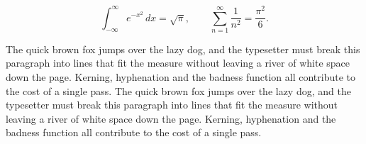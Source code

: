 \documentclass{article}
\begin{document}
\begin{equation}
\int_{-\infty}^{\infty} e^{-x^{2}}\,dx = \sqrt{\pi}, \qquad
\sum_{n=1}^{\infty} \frac{1}{n^{2}} = \frac{\pi^{2}}{6}.
\end{equation}

The quick brown fox jumps over the lazy dog, and the typesetter must break this paragraph into lines that fit the measure without leaving a river of white space down the page. Kerning, hyphenation and the badness function all contribute to the cost of a single pass. The quick brown fox jumps over the lazy dog, and the typesetter must break this paragraph into lines that fit the measure without leaving a river of white space down the page. Kerning, hyphenation and the badness function all contribute to the cost of a single pass. 
\end{document}
